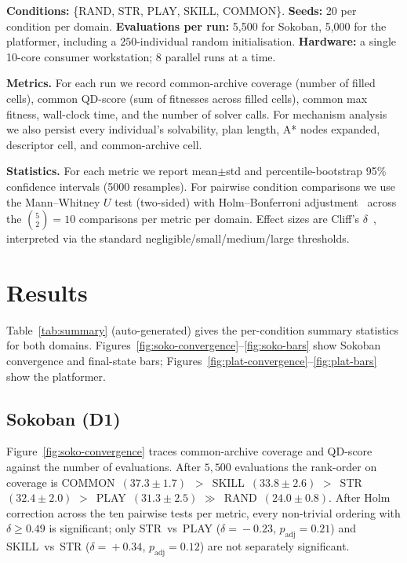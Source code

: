 \documentclass[conference]{IEEEtran}
\begin{document}
\textbf{Conditions:} \{\textsf{RAND}, \textsf{STR}, \textsf{PLAY},
\textsf{SKILL}, \textsf{COMMON}\}. \textbf{Seeds:} 20 per condition
per domain. \textbf{Evaluations per run:} 5,500 for Sokoban, 5,000
for the platformer, including a $250$-individual random
initialisation. \textbf{Hardware:} a single 10-core consumer
workstation; 8 parallel runs at a time.

\textbf{Metrics.} For each run we record common-archive coverage
(number of filled cells), common QD-score (sum of fitnesses across
filled cells), common max fitness, wall-clock time, and the number
of solver calls. For mechanism analysis we also persist every
individual's solvability, plan length, A* nodes expanded, descriptor
cell, and common-archive cell.

\textbf{Statistics.} For each metric we report mean$\pm$std and
percentile-bootstrap 95\% confidence intervals (5000 resamples). For
pairwise condition comparisons we use the Mann--Whitney $U$ test
(two-sided) with Holm--Bonferroni adjustment~\cite{holm1979simple}
across the $\binom{5}{2}=10$ comparisons per metric per domain.
Effect sizes are Cliff's $\delta$~\cite{romano2006cliffd,
vargha2000critique}, interpreted via the standard
negligible/small/medium/large thresholds.

\section{Results}
\label{sec:results}



Table~\ref{tab:summary} (auto-generated) gives the per-condition
summary statistics for both domains.
Figures~\ref{fig:soko-convergence}--\ref{fig:soko-bars} show
Sokoban convergence and final-state bars;
Figures~\ref{fig:plat-convergence}--\ref{fig:plat-bars} show the
platformer.



\subsection{Sokoban (D1)}

Figure~\ref{fig:soko-convergence} traces common-archive coverage
and QD-score against the number of evaluations. After $5{,}500$
evaluations the rank-order on coverage is
\textsf{COMMON}~$(37.3\!\pm\!1.7)$~$>$~\textsf{SKILL}~$(33.8\!\pm\!2.6)$
$>$~\textsf{STR}~$(32.4\!\pm\!2.0)$
$>$~\textsf{PLAY}~$(31.3\!\pm\!2.5)$
$\gg$~\textsf{RAND}~$(24.0\!\pm\!0.8)$.
After Holm correction across the ten pairwise tests per metric, every
non-trivial ordering with $\delta\!\geq\!0.49$ is significant; only
\textsf{STR}~vs~\textsf{PLAY} ($\delta\!=\!-0.23$, $p_\text{adj}\!=\!0.21$)
and \textsf{SKILL}~vs~\textsf{STR} ($\delta\!=\!+0.34$,
$p_\text{adj}\!=\!0.12$) are not separately significant.
\end{document}

